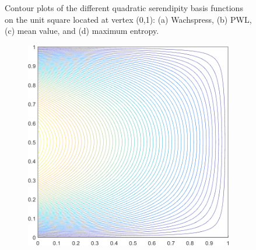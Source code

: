 \documentclass[11pt]{article}
\begin{document}
\begin{figure}
\begin{subfigure}[b]{0.240\textwidth}
		\caption{}
	\end{subfigure}
\caption{Contour plots of the different quadratic serendipity basis functions on the unit square located at vertex (0,1): (a) Wachspress, (b) PWL, (c) mean value, and (d) maximum entropy.}
\label{fig::2D_Quadratic_Summary_unit_square_basis_functions_b4}
\end{figure}

\begin{figure}
\centering
	\begin{subfigure}[b]{0.240\textwidth}
		\centering
		\includegraphics[width=\textwidth]{figures/square_WACHSPRESS2_contour_b8.png}
		\caption{}
	\end{subfigure}
	\hspace{1cm}
	\begin{subfigure}[b]{0.240\textwidth}
		\centering

\end{subfigure}
\end{figure}
\end{document}
